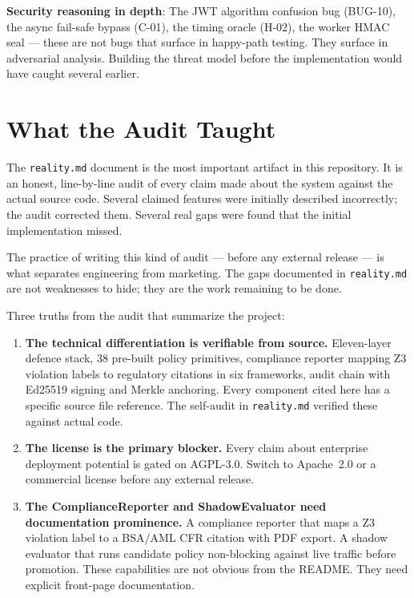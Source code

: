 \documentclass[12pt,a4paper,oneside]{report}
\newcommand{\fname}[1]{\texttt{#1}}          %
\begin{document}
\textbf{Security reasoning in depth}: The JWT algorithm confusion bug
(BUG-10), the async fail-safe bypass (C-01), the timing oracle (H-02), the
worker HMAC seal --- these are not bugs that surface in happy-path testing.
They surface in adversarial analysis. Building the threat model before the
implementation would have caught several earlier.

\section{What the Audit Taught}

The \fname{reality.md} document is the most important artifact in this
repository. It is an honest, line-by-line audit of every claim made about the
system against the actual source code. Several claimed features were initially
described incorrectly; the audit corrected them. Several real gaps were found
that the initial implementation missed.

The practice of writing this kind of audit --- before any external release ---
is what separates engineering from marketing. The gaps documented in
\fname{reality.md} are not weaknesses to hide; they are the work remaining
to be done.

Three truths from the audit that summarize the project:

\begin{enumerate}
  \item \textbf{The technical differentiation is verifiable from source.}
        Eleven-layer defence stack, 38 pre-built policy primitives, compliance
        reporter mapping Z3 violation labels to regulatory citations in six
        frameworks, audit chain with Ed25519 signing and Merkle anchoring.
        Every component cited here has a specific source file reference.  The
        self-audit in \fname{reality.md} verified these against actual code.

  \item \textbf{The license is the primary blocker.}  Every claim about
        enterprise deployment potential is gated on AGPL-3.0.  Switch to
        Apache~2.0 or a commercial license before any external release.

  \item \textbf{The ComplianceReporter and ShadowEvaluator need documentation
        prominence.}  A compliance reporter that maps a Z3 violation label to
        a BSA/AML CFR citation with PDF export.  A shadow evaluator that runs
        candidate policy non-blocking against live traffic before promotion.
        These capabilities are not obvious from the README.  They need
        explicit front-page documentation.
\end{enumerate}
\end{document}

